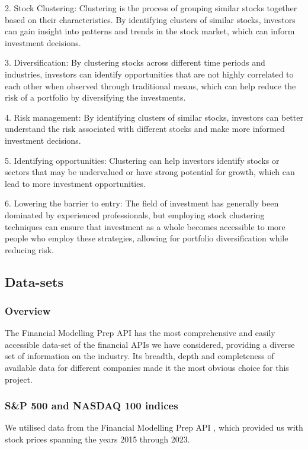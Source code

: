 \documentclass[11pt]{article}
\begin{document}
2. Stock Clustering: Clustering is the process of grouping similar stocks together based on their characteristics. By identifying clusters of similar stocks, investors can gain insight into patterns and trends in the stock market, which can inform investment decisions. 

3. Diversification: By clustering stocks across different time periods and industries, investors can identify opportunities that are not highly correlated to each other when observed through traditional means, which can help reduce the risk of a portfolio by diversifying the investments. 

4. Risk management: By identifying clusters of similar stocks, investors can better understand the risk associated with different stocks and make more informed investment decisions.

5. Identifying opportunities: Clustering can help investors identify stocks or sectors that may be undervalued or have strong potential for growth, which can lead to more investment opportunities.
 

6. Lowering the barrier to entry: The field of investment has generally been dominated by experienced professionals, but employing stock clustering techniques can ensure that investment as a whole becomes accessible to more people who employ these strategies, allowing for portfolio diversification while reducing risk.

\subsection{Data-sets}

\subsubsection{Overview}

The Financial Modelling Prep API has the most comprehensive and easily accessible data-set of the financial APIs we have considered, providing a diverse set of information on the industry. Its breadth, depth and completeness of available data for different companies made it the most obvious choice for this project.

\subsubsection{S\&P 500 and NASDAQ 100 indices}
We utilised data from the Financial Modelling Prep API \cite{fmpapi}, which provided us with stock prices spanning the years 2015 through 2023.
\end{document}

